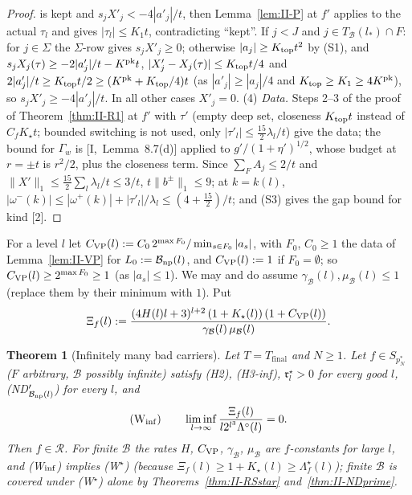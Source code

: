 \documentclass[10pt]{amsart}
\newtheorem{theorem}{Theorem}[section]
\theoremstyle{definition}
\theoremstyle{remark}
\newcommand{\Rec}{\mathcal R}
\begin{document}
\begin{proof}
is kept and $s_jX'_j<-4|a'_j|/t$, then Lemma~\ref{lem:II-P} at $f'$ applies
to the actual $\tau_l$ and gives $|\tau_l|\le K_1t$, contradicting ``kept''.
If $j<J$ and $j\in T_{\mathcal B}(l_*)\cap F$: for $j\in\Sigma$ the $\Sigma$-row
gives $s_jX'_j\ge0$; otherwise $|a_j|\ge K_{\rm top}t^2$ by (S1), and
$s_jX_j(\tau)\ge-2|a'_j|/t-K^{\rm pk}t$, $|X'_j-X_j(\tau)|\le K_{\rm top}t/4$
and $2|a'_j|/t\ge K_{\rm top}t/2\ge(K^{\rm pk}+K_{\rm top}/4)t$ (as
$|a'_j|\ge|a_j|/4$ and $K_{\rm top}\ge K_1\ge4K^{\rm pk}$), so
$s_jX'_j\ge-4|a'_j|/t$.  In all other cases $X'_j=0$.
(4) \emph{Data.}  Steps 2--3 of the proof of Theorem~\ref{thm:II-R1} at $f'$
with $\tau'$ (empty deep set, closeness $K_{\rm top}t$ instead of
$C_fK_\star t$; bounded switching is not used, only $|\tau'_l|\le\frac{15}2
\lambda_l/t$) give the data; the bound for $\Gamma_w$ is [I,~Lemma~8.7(d)]
applied to $g'/(1+\eta')^{1/2}$, whose budget at $r=\pm t$ is $r^2/2$, plus
the closeness term.  Since $\sum_FA_j\le2/t$ and $\|X'\|_1\le\frac{15}2
\sum_l\lambda_l/t\le3/t$, $t\|b^\pm\|_1\le9$; at $k=k(l)$, $|\omega^-(k)|\le
|\omega^+(k)|+|\tau'_l|/\lambda_l\le(4+\frac{15}2)/t$; and (S3) gives the gap
bound for kind [2].
\end{proof}

For a level $l$ let $C_{\rm VP}(l):=C_0\,2^{\max F_0}/\min_{s\in F_0}|a_s|$,
with $F_0$, $C_0\ge1$ the data of Lemma~\ref{lem:II-VP} for
$L_0:=\mathcal B_{\rm np}(l)$, and $C_{\rm VP}(l):=1$ if $F_0=\emptyset$; so
$C_{\rm VP}(l)\ge2^{\max F_0}\ge1$ (as $|a_s|\le1$).  We may and do assume
$\gamma_{\mathcal B}(l),\mu_{\mathcal B}(l)\le1$ (replace them by their minimum
with $1$).  Put
\[
 \Xi_f(l):=\frac{(4H(l)l+3)^{l+2}\,(1+K_\star(l))\,(1+C_{\rm VP}(l))}
 {\gamma_{\mathcal B}(l)\,\mu_{\mathcal B}(l)} .
\]

\begin{theorem}[Infinitely many bad carriers]\label{thm:II-RSinf}
Let $T=T_{\mathrm{final}}$ and $N\ge1$.  Let $f\in S_{p_N^*}$ \textup{(}$F$
arbitrary, $\mathcal B$ possibly infinite\textup{)} satisfy \textup{(H2)},
\textup{(H3-inf)}, $\mathfrak r^\star_l>0$ for every good $l$,
\textup{(ND$'_{\mathcal B_{\rm np}(l)}$)} for every $l$, and
\[
 \textup{(W$_{\rm inf}$)}\qquad\liminf_{l\to\infty}\frac{\Xi_f(l)}
 {l2^{l^3}\Lambda^\circ(l)}=0 .
\]
Then $f\in\Rec$.  For finite $\mathcal B$ the rates $H$, $C_{\rm VP}$,
$\gamma_{\mathcal B}$, $\mu_{\mathcal B}$ are $f$-constants for large $l$, and
\textup{(W$_{\rm inf}$)} implies \textup{(W$^\star$)} \textup{(}because
$\Xi_f(l)\ge1+K_\star(l)\ge\Lambda^\star_f(l)$\textup{)}; finite $\mathcal B$ is
covered under \textup{(W$^\star$)} alone by Theorems~\textup{\ref{thm:II-RSstar}}
and~\textup{\ref{thm:II-NDprime}}.
\end{theorem}
\end{document}
